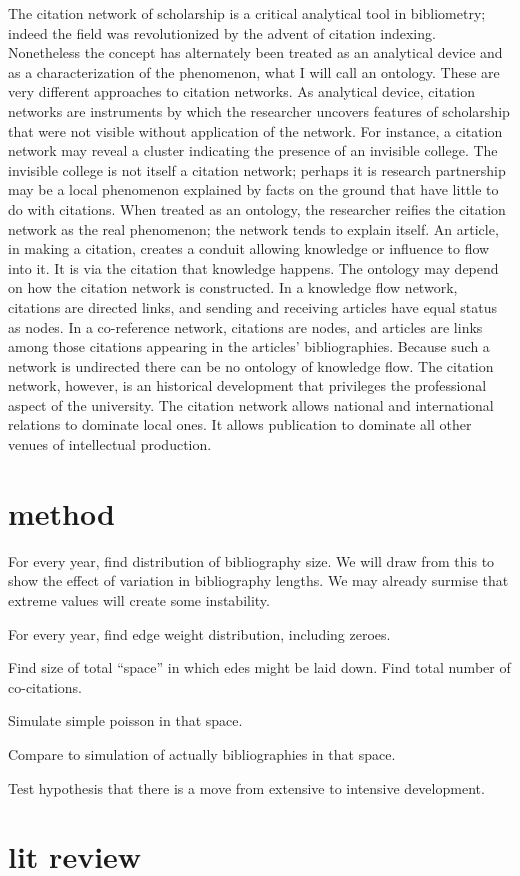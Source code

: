 \documentclass[]{book}
\theoremstyle{definition}
\theoremstyle{definition}
\theoremstyle{definition}
\theoremstyle{remark}
\begin{document}
The citation network of scholarship is a critical analytical tool in
bibliometry; indeed the field was revolutionized by the advent of
citation indexing. Nonetheless the concept has alternately been treated
as an analytical device and as a characterization of the phenomenon,
what I will call an ontology. These are very different approaches to
citation networks. As analytical device, citation networks are
instruments by which the researcher uncovers features of scholarship
that were not visible without application of the network. For instance,
a citation network may reveal a cluster indicating the presence of an
invisible college. The invisible college is not itself a citation
network; perhaps it is research partnership may be a local phenomenon
explained by facts on the ground that have little to do with citations.
When treated as an ontology, the researcher reifies the citation network
as the real phenomenon; the network tends to explain itself. An article,
in making a citation, creates a conduit allowing knowledge or influence
to flow into it. It is via the citation that knowledge happens. The
ontology may depend on how the citation network is constructed. In a
knowledge flow network, citations are directed links, and sending and
receiving articles have equal status as nodes. In a co-reference
network, citations are nodes, and articles are links among those
citations appearing in the articles' bibliographies. Because such a
network is undirected there can be no ontology of knowledge flow. The
citation network, however, is an historical development that privileges
the professional aspect of the university. The citation network allows
national and international relations to dominate local ones. It allows
publication to dominate all other venues of intellectual production.

\hypertarget{method-1}{%
\section{method}\label{method-1}}

For every year, find distribution of bibliography size. We will draw
from this to show the effect of variation in bibliography lengths. We
may already surmise that extreme values will create some instability.

For every year, find edge weight distribution, including zeroes.

Find size of total ``space'' in which edes might be laid down. Find
total number of co-citations.

Simulate simple poisson in that space.

Compare to simulation of actually bibliographies in that space.

Test hypothesis that there is a move from extensive to intensive
development.

\hypertarget{lit-review}{%
\section{lit review}\label{lit-review}}


\end{document}
